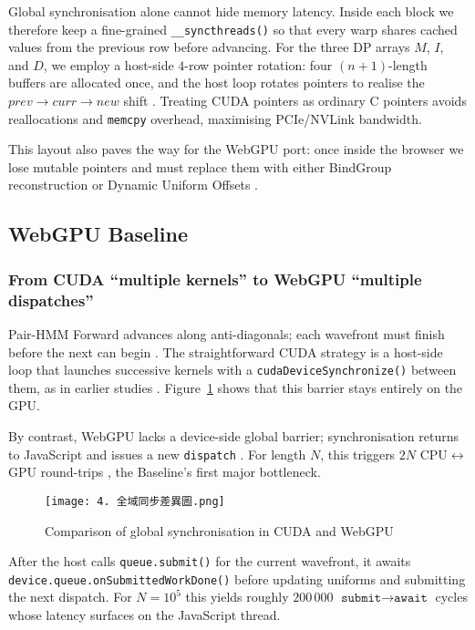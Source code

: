 \documentclass[PhD]{PHlab-thesis}
\begin{document}
Global synchronisation alone cannot hide memory latency. Inside each block we therefore keep a fine-grained \texttt{\_\_syncthreads()} so that every warp shares cached values from the previous row before advancing. For the three DP arrays $M$, $I$, and $D$, we employ a host-side $4$-row pointer rotation: four $(n+1)$-length buffers are allocated once, and the host loop rotates pointers to realise the $\textit{prev}\!\rightarrow\!\textit{curr}\!\rightarrow\!\textit{new}$ shift \cite{LiuWirawan2013}. Treating CUDA pointers as ordinary C pointers avoids reallocations and \texttt{memcpy} overhead, maximising PCIe/NVLink bandwidth.

This layout also paves the way for the WebGPU port: once inside the browser we lose mutable pointers and must replace them with either BindGroup reconstruction or Dynamic Uniform Offsets \cite{Chrome2024-blog}.



\subsection{WebGPU Baseline}

\subsubsection{From CUDA “multiple kernels” to WebGPU “multiple dispatches”}
Pair-HMM Forward advances along anti-diagonals; each wavefront must finish before the next can begin \cite{Durbin1998}. The straightforward CUDA strategy is a host-side loop that launches successive kernels with a \texttt{cudaDeviceSynchronize()} between them, as in earlier studies \cite{Banerjee2017,Schmidt2024-gpuPairHMM}. Figure~\ref{fig:global-sync-diff} shows that this barrier stays entirely on the GPU.

By contrast, WebGPU lacks a device-side global barrier; synchronisation returns to JavaScript and issues a new \texttt{dispatch} \cite{W3C2024-webgpu}. For length $N$, this triggers $2N$ CPU$\leftrightarrow$GPU round-trips \cite{Chrome2024-blog}, the Baseline’s first major bottleneck.

\begin{figure}[htbp]
    \centering
    \texttt{[image: 4. 全域同步差異圖.png]}
    \caption{Comparison of global synchronisation in CUDA and WebGPU}
    \label{fig:global-sync-diff}
\end{figure}

After the host calls \texttt{queue.submit()} for the current wavefront, it awaits \texttt{device.queue.onSubmittedWorkDone()} before updating uniforms and submitting the next dispatch. For $N=10^{5}$ this yields roughly $200\,000$ \(\texttt{submit}\!\rightarrow\!\texttt{await}\) cycles whose latency surfaces on the JavaScript thread.
\end{document}
